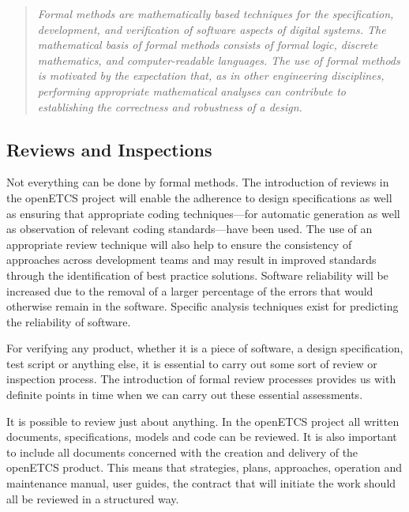 \documentclass{template/openetcs_report}
\begin{document}
\begin{quote}
{\em Formal methods are mathematically based techniques for the
specification, development, and verification of software aspects of
digital systems.
%
The mathematical basis of formal methods consists
of formal logic, discrete mathematics, and computer-readable
languages.
%
The use of formal methods is motivated by the expectation
that, as in other engineering disciplines, performing appropriate
mathematical analyses can contribute to establishing the correctness
and robustness of a design.}

\hfill
\cite[Section~1.0, p.1]{DO-333}
\end{quote}


\subsection{Reviews and Inspections}
\label{sec:reviews-inspec}

Not everything can be done by formal methods. The introduction of reviews
 in the openETCS project will enable the
adherence to design specifications as well as ensuring that
appropriate coding techniques---for automatic generation as well as 
observation of relevant coding
standards---have been used.  The use of an appropriate review technique
will also help to ensure the consistency of approaches across development teams
and may result in improved standards through the identification of
best practice solutions.  Software reliability will be increased due
to the removal of a larger percentage of the errors that would
otherwise remain in the software. Specific analysis techniques
exist for predicting the reliability of software.

For verifying any product, whether it is a piece of
software, a design specification, test script or anything else, it is 
essential to carry out some sort of review or inspection process. 
The introduction of formal review processes provides us with 
definite points in time when we can carry out these essential 
assessments.

It is possible to review just about anything. In the openETCS project
all written documents, specifications, models and code can be
reviewed. It is also important to include all documents concerned with
the creation and delivery of the openETCS product. This means that
strategies, plans, approaches, operation and maintenance manual, user
guides, the contract that will initiate the work should all be
reviewed in a structured way.
\end{document}
